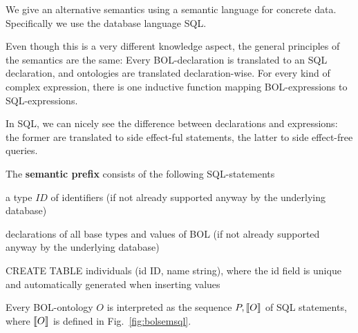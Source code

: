 We give an alternative semantics using a semantic language for concrete data.
Specifically we use the database language SQL.

Even though this is a very different knowledge aspect, the general principles of the semantics are the same:
Every BOL-declaration is translated to an SQL declaration, and ontologies are translated declaration-wise.
For every kind of complex expression, there is one inductive function mapping BOL-expressions to SQL-expressions.

In SQL, we can nicely see the difference between declarations and expressions: the former are translated to side effect-ful statements, the latter to side effect-free queries.

\begin{definition}\label{def:bolsem:sql}
The \textbf{semantic prefix} consists of the following SQL-statements
\begin{compactitem}
 \item a type $ID$ of identifiers (if not already supported anyway by the underlying database)
 \item declarations of all base types and values of BOL (if not already supported anyway by the underlying database)
 \item CREATE TABLE individuals (id ID, name string), where the id field is unique and automatically generated when inserting values
\end{compactitem}

Every BOL-ontology $O$ is interpreted as the sequence $P,\llbracket O\rrbracket$ of SQL statements, where $\llbracket O\rrbracket$ is defined in Fig.~\ref{fig:bolsemsql}.
\end{definition}

